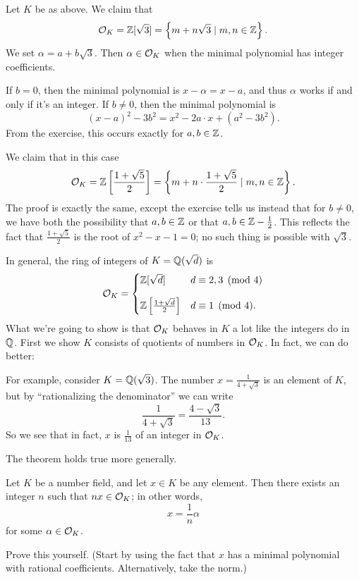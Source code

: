 \begin{example}
	[Ring of integers of $K = \QQ(\sqrt3)$]
	Let $K$ be as above.
	We claim that \[ \mathcal O_K = \mathbb Z[\sqrt 3] = \left\{ m + n\sqrt 3 \mid m,n \in \mathbb Z  \right\}. \]
	We set $\alpha = a + b \sqrt 3$.
	Then $\alpha \in \mathcal O_K$ when the minimal polynomial has integer coefficients.

	If $b = 0$, then the minimal polynomial is $x-\alpha=x-a$,
	and thus $\alpha$ works if and only if it's an integer.
	If $b \neq 0$, then the minimal polynomial is
	\[ (x-a)^2 - 3b^2 = x^2 - 2a \cdot x + (a^2-3b^2). \]
	From the exercise, this occurs exactly for $a,b \in \mathbb Z$.
\end{example}
\begin{example}
	[Ring of integers of $K = \QQ(\sqrt 5)$]
	We claim that in this case
	\[ \mathcal O_K = \mathbb Z\left[ \frac{1+\sqrt5}{2} \right]
	= \left\{ m + n \cdot \frac{1+\sqrt5}{2} \mid m,n \in \mathbb Z \right\}. \]
	The proof is exactly the same, except the exercise tells us instead
	that for $b \neq 0$, we have both the possibility that $a,b \in \mathbb Z$
	or that $a,b \in \mathbb Z - \frac{1}{2}$.
	This reflects the fact that $\frac{1+\sqrt5}{2}$ is the root of $x^2-x-1 = 0$;
	no such thing is possible with $\sqrt 3$.
\end{example}
In general, the ring of integers of $K = \mathbb Q(\sqrt d)$ is
\[ \mathcal O_K
	=
	\begin{cases}
		\mathbb Z[\sqrt d] & d\equiv 2,3 \pmod 4 \\[1em]
		\mathbb Z\left[ \frac{1+\sqrt d}{2} \right] & d \equiv 1 \pmod 4.
	\end{cases}
\]
What we're going to show is that $\mathcal O_K$ behaves in $K$
a lot like the integers do in $\mathbb Q$.
First we show $K$ consists of quotients of numbers in $\mathcal O_K$.
In fact, we can do better:
\begin{example}
	For example, consider $K = \QQ(\sqrt3)$.
	The number $x = \frac{1}{4+\sqrt3}$ is an element of $K$, but by
	``rationalizing the denominator'' we can write
	\[ \frac{1}{4+\sqrt3} = \frac{4-\sqrt3}{13}. \]
	So we see that in fact, $x$ is $\frac{1}{13}$ of an integer in $\mathcal O_K$.
\end{example}

The theorem holds true more generally.
\begin{theorem}[$K = \QQ \cdot \OO_K$]
	\label{thm:rationalize_denom}
	Let $K$ be a number field, and let $x \in K$ be any element.
	Then there exists an integer $n$ such that $nx \in \mathcal O_K$;
	in other words, \[ x = \frac 1n \alpha \] for some $\alpha \in \mathcal O_K$.
\end{theorem}
\begin{exercise}
	Prove this yourself.
	(Start by using the fact that $x$ has a minimal
	polynomial with rational coefficients.
	Alternatively, take the norm.)
\end{exercise}

